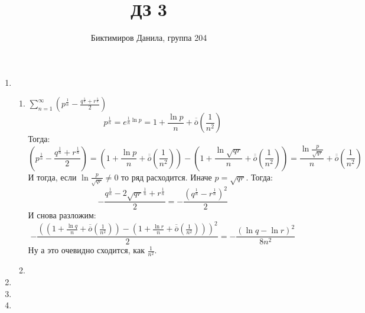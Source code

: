 \documentclass[11pt]{article}
\begin{document}
	
	\author{Биктимиров Данила, группа 204}
	\title{ДЗ 3}
	\date{}
	\maketitle
	
	\medskip
	
	\begin{enumerate}
		
		\item \begin{enumerate}
			\item $\sum_{n=1}^{\infty} \left(p^{\frac{1}{n}}-\frac{q^{\frac{1}{n}} + r^{\frac{1}{n}}}{2} \right)$
			$$p^{\frac{1}{n}} = e^{\frac{1}{n}\ln p}=1+\frac{\ln p}{n} + \overline{\overline{o}} \left(\frac{1}{n^2}\right)$$
			Тогда: $$ \left(p^{\frac{1}{n}} - \frac{q^{\frac{1}{n}} + r^{\frac{1}{n}}}{2} \right) = \left(1+\frac{\ln p}{n} + \overline{\overline{o}} \left(\frac{1}{n^2}\right)\right)-\left( 1+\frac{\ln \sqrt{qr}}{n} + \overline{\overline{o}} \left(\frac{1}{n^2}\right) \right)=\frac{\ln{\frac{p}{\sqrt{qr}}}}{n}+\overline{\overline{o}}\left(\frac{1}{n^2}\right)$$
			И тогда, если $\ln \frac{p}{\sqrt{qr}}\not=0$ то ряд расходится. Иначе $p=\sqrt{qr}$. Тогда: $$-\frac{q^\frac{1}{n}-2\sqrt{qr}^{\frac{1}{n}}+r^\frac{1}{n}}{2}=-\frac{\left(q^{\frac{1}{n}}-r^{\frac{1}{n}}\right)^2}{2}$$
			И снова разложим: $$-\frac{\left(\left(1+\frac{\ln q}{n} + \overline{\overline{o}} \left(\frac{1}{n^2}\right)\right)-\left(1+\frac{\ln r}{n} + \overline{\overline{o}} \left(\frac{1}{n^2}\right)\right)\right)^2}{2}=-\frac{\left(\ln q - \ln r\right)^2}{8n^2}$$
			Ну а это очевидно сходится, как $\frac{1}{n^2}$.
			\item
		\end{enumerate}
		\item
		
		\item
		
		\item
		
	\end{enumerate}
\end{document}
